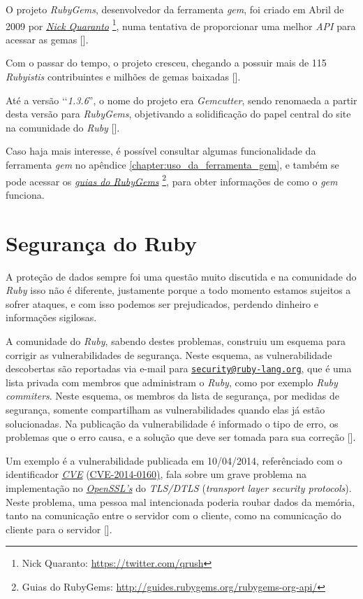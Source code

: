 O projeto \emph{RubyGems}, desenvolvedor da ferramenta \emph{gem}, foi criado em Abril de 2009 por
\emph{\href{https://twitter.com/qrush}{Nick Quaranto}} \footnote{Nick Quaranto: \url{https://twitter.com/qrush}},
numa tentativa de proporcionar uma melhor \emph{API} para acessar as gemas [].

Com o passar do tempo, o projeto cresceu, chegando a possuir mais de 115 \emph{Rubyistis} contribuintes e
milhões de gemas baixadas [].

Até a versão ‘‘\emph{1.3.6}'', o nome do projeto era \emph{Gemcutter}, sendo renomaeda a partir desta versão
para \emph{RubyGems}, objetivando a solidificação do papel central do site na comunidade do \emph{Ruby}
[].

Caso haja mais interesse, é possível consultar algumas funcionalidade da ferramenta \emph{gem} no apêndice
\ref{chapter:uso_da_ferramenta_gem}, e também se pode acessar os
\emph{\href{http://guides.rubygems.org/rubygems-org-api/}{guias do RubyGems}} 
\footnote{Guias do RubyGems: \url{http://guides.rubygems.org/rubygems-org-api/}}, para obter informações
de como o \emph{gem} funciona.

\section{Segurança do Ruby}
\label{section:segurança_do_ruby}

A proteção de dados sempre foi uma questão muito discutida e na comunidade do \emph{Ruby} isso não é
diferente, justamente porque a todo momento estamos sujeitos a sofrer ataques, e com isso podemos ser
prejudicados, perdendo dinheiro e informações sigilosas.

A comunidade do \emph{Ruby}, sabendo destes problemas, construiu um esquema para corrigir as
vulnerabilidades de segurança. Neste esquema, as vulnerabilidade descobertas são reportadas via e-mail para
\href{mailto:security@ruby-lang.org}{\nolinkurl{security@ruby-lang.org}}, que é uma lista privada com
membros que administram o \emph{Ruby}, como por exemplo \emph{Ruby commiters}. Neste esquema, os membros da
lista de segurança, por medidas de segurança, somente compartilham as vulnerabilidades quando elas já estão
solucionadas. Na publicação da vulnerabilidade é informado o tipo de erro, os problemas que o erro causa,
e a solução que deve ser tomada para sua correção [].

Um exemplo é a vulnerabilidade publicada em 10/04/2014, referênciado com o identificador
\emph{\href{https://cve.mitre.org/}{CVE}}
(\href{https://web.nvd.nist.gov/view/vuln/detail?vulnId=CVE-2014-0160}{CVE-2014-0160)}, fala sobre um grave
problema na implementação no \emph{\href{https://www.openssl.org}{OpenSSL’s}} do \emph{TLS/DTLS} (\emph{transport
layer security protocols}). Neste problema, uma pessoa mal intencionada poderia roubar dados da memória, tanto
na comunicação entre o servidor com o cliente, como na comunicação do cliente para o servidor
[].

